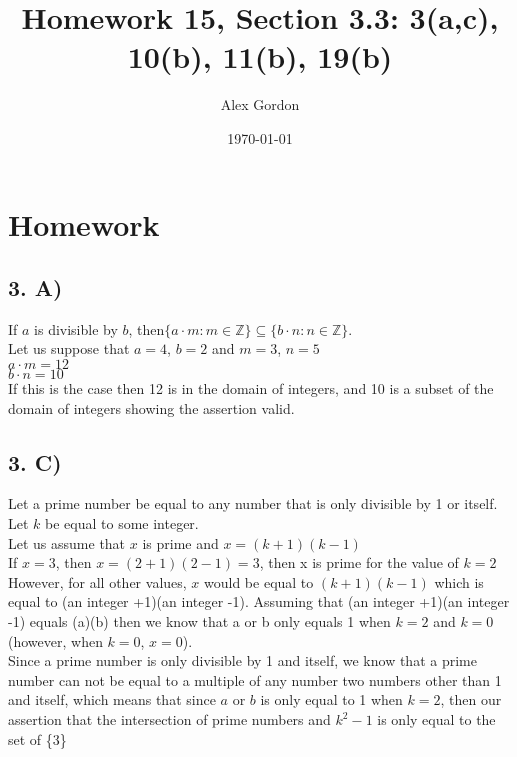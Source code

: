 \documentclass[12]{scrartcl}
\begin{document}
\title{Homework 15, Section 3.3: 3(a,c), 10(b), 11(b), 19(b) }
\author{Alex Gordon}
\date{\today}
\maketitle
\section*{Homework}
\subsection*{3. A)}
If $a$ is divisible by $b$, then$ \{ a \cdot m : m \in \mathds{Z} \} \subseteq \{b \cdot n : n \in \mathds{Z} \} $.
\\Let us suppose that $a = 4$, $b = 2$ and $m = 3$, $n = 5$
\\$a \cdot m = 12$
\\$b \cdot n = 10$
\\If this is the case then 12 is in the domain of integers, and 10 is a subset of the domain of integers showing the assertion valid. 
\subsection*{3. C)}
Let a prime number be equal to any number that is only divisible by 1 or itself.\\
Let $k$ be equal to some integer.\\
Let us assume that $x$ is prime and $x = (k + 1)(k - 1)$\\
If $x = 3$, then $x = (2 + 1)(2 -1) = 3$, then x is prime for the value of $k = 2$ \\
However, for all other values, $x$ would be equal to $(k + 1)(k - 1)$ which is equal to (an integer +1)(an integer -1). Assuming that (an integer +1)(an integer -1) equals (a)(b) then we know that a or b only equals 1 when $k = 2$ and $k = 0$ (however, when $k = 0$, $x = 0$). \\
Since a prime number is only divisible by 1 and itself, we know that a prime number can not be equal to a multiple of any number two numbers other than 1 and itself, which means that since $a$ or $b$ is only equal to 1 when $k = 2$, then our assertion that the intersection of prime numbers and $k^2 - 1$ is only equal to the set of \{3\}
\end{document}
